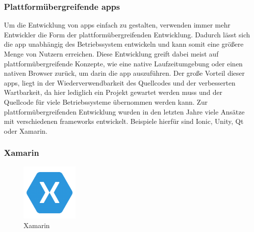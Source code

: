 \subsubsection{Plattformübergreifende \glspl{app}}

Um die Entwicklung von \glspl{app} einfach zu gestalten, verwenden immer mehr Entwickler die Form der plattformübergreifenden Entwicklung. Dadurch lässt sich die \gls{app} unabhängig des Betriebssystem entwickeln und kann somit eine größere Menge von Nutzern erreichen. Diese Entwicklung greift dabei meist auf plattformübergreifende Konzepte, wie eine native Laufzeitumgebung oder einen nativen Browser zurück, um darin die \gls{app} auszuführen. Der große Vorteil dieser \glspl{app}, liegt in der Wiederverwendbarkeit des Quellcodes und der verbesserten Wartbarkeit, da hier lediglich ein Projekt gewartet werden muss und der Quellcode für viele Betriebssysteme übernommen werden kann. Zur plattformübergreifenden Entwicklung wurden in den letzten Jahre viele Ansätze mit verschiedenen \glspl{framework} entwickelt. Beispiele hierfür sind Ionic, Unity, Qt oder Xamarin.\\
\newpage

\subsubsection{Xamarin}

\begin{figure}
	\begin{center}
		\includegraphics[width=0.25\textwidth]{images/technische_grundlagen/xamarin.png}
	\end{center}
	\caption{Xamarin \cite{Xamarin}}
	\label{fig:xamarin}
\end{figure}

